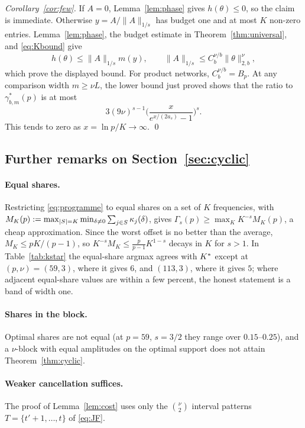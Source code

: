 \emph{Corollary~\ref{cor:few}.} If $A=0$, Lemma~\ref{lem:phase} gives $h(\theta)\le0$, so the claim is immediate. Otherwise $y=A/\|A\|_{1/s}$ has budget one and at most $K$ non-zero entries. Lemma~\ref{lem:phase}, the budget estimate in Theorem~\ref{thm:universal}, and \eqref{eq:Kbound} give
\[
h(\theta)\le\|A\|_{1/s}m(y),\qquad
\|A\|_{1/s}\le C_b^{\nu/b}\|\theta\|_{2,b}^\nu,
\]
which prove the displayed bound. For product networks, $C_b^{\nu/b}=B_p$. At any comparison width $m\ge\nu L$, the lower bound just proved shows that the ratio to $\gamma^*_{b,m}(p)$ is at most
\[
3(9\nu)^{s-1}\Big(\frac{x}{e^{x/(2a_s)}-1}\Big)^s.
\]
This tends to zero as $x=\ln p/K\to\infty$. \qed

\subsection{Further remarks on Section~\ref{sec:cyclic}}\label{app:remarks}

\paragraph{Equal shares.} Restricting \eqref{eq:programme} to equal shares on a set of $K$ frequencies, with $M_K(p):=\max_{|S|=K}\min_{\delta\neq0}\sum_{j\in S}\kappa_{j}(\delta)$, gives $\Gamma_s(p)\ge\max_KK^{-s}M_K(p)$, a cheap approximation. Since the worst offset is no better than the average, $M_K\le pK/(p-1)$, so $K^{-s}M_K\le\frac p{p-1}K^{1-s}$ decays in $K$ for $s>1$. In Table~\ref{tab:kstar} the equal-share argmax agrees with $K^{*}$ except at $(p,\nu)=(59,3)$, where it gives $6$, and $(113,3)$, where it gives $5$; where adjacent equal-share values are within a few percent, the honest statement is a band of width one.

\paragraph{Shares in the block.} Optimal shares are not equal (at $p=59$, $s=3/2$ they range over $0.15$--$0.25$), and a $\nu$-block with equal amplitudes on the optimal support does not attain Theorem~\ref{thm:cyclic}.

\paragraph{Weaker cancellation suffices.} The proof of Lemma~\ref{lem:cost} uses only the $\binom\nu2$ interval patterns $T=\{t'+1,\dots,t\}$ of \eqref{eq:JF}.

